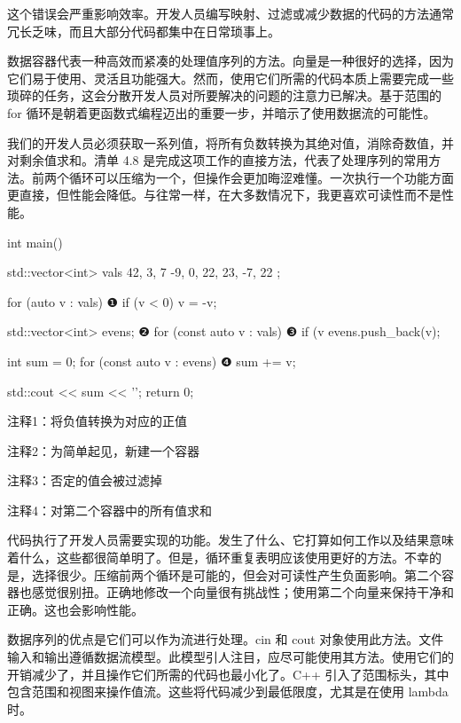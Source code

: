 这个错误会严重影响效率。开发人员编写映射、过滤或减少数据的代码的方法通常冗长乏味，而且大部分代码都集中在日常琐事上。


数据容器代表一种高效而紧凑的处理值序列的方法。向量是一种很好的选择，因为它们易于使用、灵活且功能强大。然而，使用它们所需的代码本质上需要完成一些琐碎的任务，这会分散开发人员对所要解决的问题的注意力已解决。基于范围的 for 循环是朝着更函数式编程迈出的重要一步，并暗示了使用数据流的可能性。

我们的开发人员必须获取一系列值，将所有负数转换为其绝对值，消除奇数值，并对剩余值求和。清单 4.8 是完成这项工作的直接方法，代表了处理序列的常用方法。前两个循环可以压缩为一个，但操作会更加晦涩难懂。一次执行一个功能方面更直接，但性能会降低。与往常一样，在大多数情况下，我更喜欢可读性而不是性能。


\begin{cpp}
int main() {
  std::vector<int> vals { 42, 3, 7 -9, 0, 22, 23, -7, 22 };

  for (auto v : vals) ❶
    if (v < 0)
      v = -v;

  std::vector<int> evens; ❷
  for (const auto v : vals) ❸
    if (v %
      evens.push_back(v);

  int sum = 0;
  for (const auto v : evens) ❹
    sum += v;

  std::cout << sum << '\n';
  return 0;
}
\end{cpp}

{\footnotesize
注释1：将负值转换为对应的正值

注释2：为简单起见，新建一个容器

注释3：否定的值会被过滤掉

注释4：对第二个容器中的所有值求和
}


代码执行了开发人员需要实现的功能。发生了什么、它打算如何工作以及结果意味着什么，这些都很简单明了。但是，循环重复表明应该使用更好的方法。不幸的是，选择很少。压缩前两个循环是可能的，但会对可读性产生负面影响。第二个容器也感觉很别扭。正确地修改一个向量很有挑战性；使用第二个向量来保持干净和正确。这也会影响性能。


数据序列的优点是它们可以作为流进行处理。cin 和 cout 对象使用此方法。文件输入和输出遵循数据流模型。此模型引人注目，应尽可能使用其方法。使用它们的开销减少了，并且操作它们所需的代码也最小化了。C++ 引入了范围标头，其中包含范围和视图来操作值流。这些将代码减少到最低限度，尤其是在使用 lambda 时。

